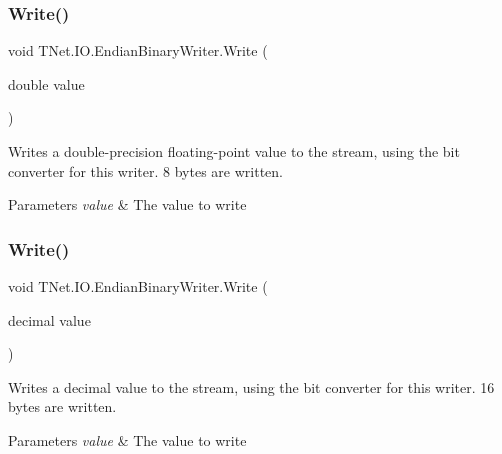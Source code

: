 \subsubsection{\texorpdfstring{Write()}{Write()}\hspace{0.1cm}{\footnotesize\ttfamily [9/17]}}
{\footnotesize\ttfamily void T\+Net.\+I\+O.\+Endian\+Binary\+Writer.\+Write (\begin{DoxyParamCaption}\item[{double}]{value }\end{DoxyParamCaption})}



Writes a double-\/precision floating-\/point value to the stream, using the bit converter for this writer. 8 bytes are written. 


\begin{DoxyParams}{Parameters}
{\em value} & The value to write\\
\hline
\end{DoxyParams}
\mbox{\label{class_t_net_1_1_i_o_1_1_endian_binary_writer_a60aeee8bbb41fcc3f6b47a4fe7ca05e1}} 
\subsubsection{\texorpdfstring{Write()}{Write()}\hspace{0.1cm}{\footnotesize\ttfamily [10/17]}}
{\footnotesize\ttfamily void T\+Net.\+I\+O.\+Endian\+Binary\+Writer.\+Write (\begin{DoxyParamCaption}\item[{decimal}]{value }\end{DoxyParamCaption})}



Writes a decimal value to the stream, using the bit converter for this writer. 16 bytes are written. 


\begin{DoxyParams}{Parameters}
{\em value} & The value to write\\
\hline
\end{DoxyParams}
\mbox{\label{class_t_net_1_1_i_o_1_1_endian_binary_writer_afcd2041bb036d51b0c43e54079056164}} 
